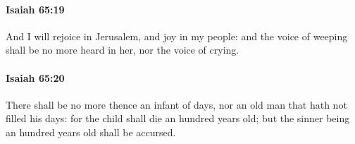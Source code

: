 		\paragraph{Isaiah 65:19} %
			\label{ISAIAH-65-19}

			And I will rejoice in Jerusalem, and joy in my people: and the voice of weeping shall be no more heard in her, nor the voice of crying.


		\paragraph{Isaiah 65:20} %
			\label{ISAIAH-65-20}

			There shall be no more thence an infant of days, nor an old man that hath not filled his days: for the child shall die an hundred years old; but the sinner being an hundred years old shall be accursed.


